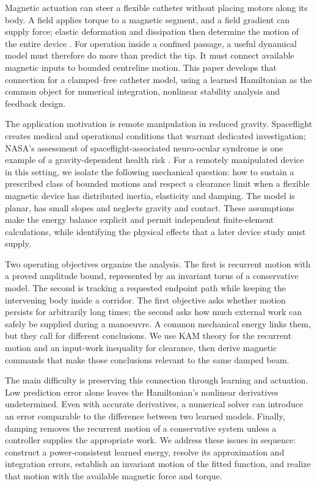 Magnetic actuation can steer a flexible catheter without placing motors along its body. A field applies torque to a magnetic segment, and a field gradient can supply force; elastic deformation and dissipation then determine the motion of the entire device \citep{abbott,kim}. For operation inside a confined passage, a useful dynamical model must therefore do more than predict the tip. It must connect available magnetic inputs to bounded centreline motion. This paper develops that connection for a clamped--free catheter model, using a learned Hamiltonian as the common object for numerical integration, nonlinear stability analysis and feedback design.

The application motivation is remote manipulation in reduced gravity. Spaceflight creates medical and operational conditions that warrant dedicated investigation; NASA's assessment of spaceflight-associated neuro-ocular syndrome is one example of a gravity-dependent health risk \citep{nasa}. For a remotely manipulated device in this setting, we isolate the following mechanical question: how to sustain a prescribed class of bounded motions and respect a clearance limit when a flexible magnetic device has distributed inertia, elasticity and damping. The model is planar, has small slopes and neglects gravity and contact. These assumptions make the energy balance explicit and permit independent finite-element calculations, while identifying the physical effects that a later device study must supply.

Two operating objectives organize the analysis. The first is recurrent motion with a proved amplitude bound, represented by an invariant torus of a conservative model. The second is tracking a requested endpoint path while keeping the intervening body inside a corridor. The first objective asks whether motion persists for arbitrarily long times; the second asks how much external work can safely be supplied during a manoeuvre. A common mechanical energy links them, but they call for different conclusions. We use KAM theory for the recurrent motion and an input-work inequality for clearance, then derive magnetic commands that make those conclusions relevant to the same damped beam.

The main difficulty is preserving this connection through learning and actuation. Low prediction error alone leaves the Hamiltonian's nonlinear derivatives undetermined. Even with accurate derivatives, a numerical solver can introduce an error comparable to the difference between two learned models. Finally, damping removes the recurrent motion of a conservative system unless a controller supplies the appropriate work. We address these issues in sequence: construct a power-consistent learned energy, resolve its approximation and integration errors, establish an invariant motion of the fitted function, and realize that motion with the available magnetic force and torque.

